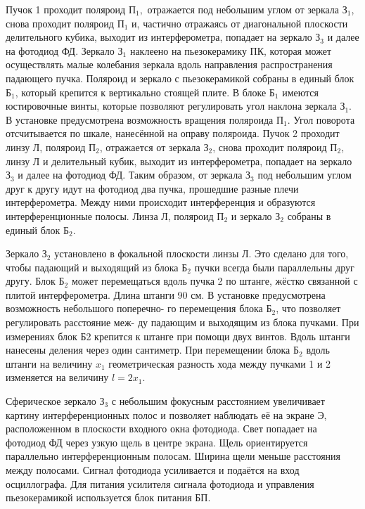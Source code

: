 \documentclass[a4paper,12pt]{article} %
\begin{document}
Пучок 1 проходит поляроид $ \text{П}_1, $ отражается под небольшим углом от зеркала $ \text{З}_1 $, снова проходит поляроид $ \text{П}_1 $ и, частично отражаясь от диагональной плоскости делительного кубика, выходит из интерферометра, попадает на зеркало $ \text{З}_3 $ и далее на фотодиод ФД. Зеркало $ \text{З}_1 $ наклеено на пьезокерамику ПК, которая может осуществлять малые колебания зеркала вдоль направления распространения падающего пучка. Поляроид и зеркало с пьезокерамикой собраны в единый блок $ \text{Б}_1 $, который крепится к вертикально стоящей плите. В блоке $ \text{Б}_1 $ имеются юстировочные винты, которые позволяют регулировать угол наклона зеркала $ \text{З}_1 $. В установке предусмотрена возможность вращения поляроида $ \text{П}_1 $. Угол поворота отсчитывается по шкале, нанесённой на оправу поляроида.
Пучок 2 проходит линзу Л, поляроид $ \text{П}_2 $, отражается от зеркала $ \text{З}_2 $, снова проходит поляроид $ \text{П}_2 $, линзу Л и делительный кубик, выходит из интерферометра, попадает на зеркало $ \text{З}_3 $ и далее на фотодиод ФД. Таким образом, от зеркала $ \text{З}_3 $ под небольшим углом друг к другу идут на фотодиод два пучка, прошедшие разные плечи интерферометра. Между ними происходит интерференция и образуются интерференционные полосы. Линза Л, поляроид $ \text{П}_2 $ и зеркало $ \text{З}_2 $ собраны в единый блок $ \text{Б}_2 $.

Зеркало $ \text{З}_2 $ установлено в фокальной плоскости линзы Л. Это сделано
для того, чтобы падающий и выходящий из блока $ \text{Б}_2 $ пучки всегда были
параллельны друг другу. Блок $ \text{Б}_2 $ может перемещаться вдоль пучка 2
по штанге, жёстко связанной с плитой интерферометра. Длина штанги
90 см. В установке предусмотрена возможность небольшого поперечно-
го перемещения блока $ \text{Б}_2 $, что позволяет регулировать расстояние меж-
ду падающим и выходящим из блока пучками. При измерениях блок
Б2 крепится к штанге при помощи двух винтов. Вдоль штанги нанесены деления через один сантиметр. При перемещении блока $ \text{Б}_2 $ вдоль
штанги на величину $ x_1 $ геометрическая разность хода между пучками
1 и 2 изменяется на величину $ l = 2x_1 $.

Сферическое зеркало $ \text{З}_3 $ с небольшим фокусным расстоянием увеличивает картину интерференционных полос и позволяет наблюдать её
на экране Э, расположенном в плоскости входного окна фотодиода.
Свет попадает на фотодиод ФД через узкую щель в центре экрана.
Щель ориентируется параллельно интерференционным полосам. Ширина щели меньше расстояния между полосами. Сигнал фотодиода усиливается и подаётся на вход осциллографа. Для питания усилителя
сигнала фотодиода и управления пьезокерамикой используется блок
питания БП.
\end{document}
